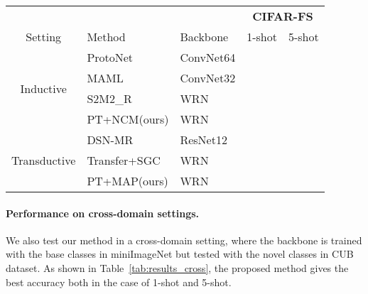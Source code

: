 \documentclass[twoside]{article}
\begin{document}
\begin{table*}[h]
{\begin{tabular}{c|l|l|l|l}
         \toprule
         &     &     & \multicolumn{2}{c}{\textbf{CIFAR-FS}} \\
         Setting & Method & Backbone & 1-shot & 5-shot \\
         \midrule
         \multirow{4}{*}{Inductive}
         &ProtoNet~\cite{snell2017prototypical} & ConvNet64 &  & \\
         &MAML~\cite{finn2017model} & ConvNet32 &  & \\
&S2M2\_R~\cite{mangla2020charting} & WRN &  & \\
         &PT+NCM(ours) & WRN &  & \\
         \midrule
         \multirow{3}{*}{Transductive}
         &DSN-MR~\cite{simon2020adaptive} & ResNet12 &  & \\
         &Transfer+SGC~\cite{hu2020exploiting} & WRN &  & \\
&PT+MAP(ours) & WRN &  & \\
         \bottomrule
\end{tabular}
    }
    \label{tab:results}
\end{table*}

\paragraph{Performance on cross-domain settings.} We also test our method in a cross-domain setting, where the backbone is trained with the base classes in miniImageNet but tested with the novel classes in CUB dataset. As shown in Table~\ref{tab:results_cross}, the proposed method gives the best accuracy both in the case of 1-shot and 5-shot. 
\end{document}
